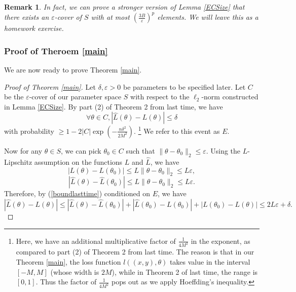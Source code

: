 \documentclass[11pt]{article}
\newtheorem{remark}[theorem]{Remark}
\newcommand{\norm}[1]{\| #1 \|}
\renewcommand{\epsilon}{\varepsilon}
\begin{document}
\begin{remark}
In fact, we can prove a stronger version of Lemma \ref{ECSize} that there exists an $\epsilon$-cover of $S$ with at most $\left(\frac{3B}{\epsilon}\right)^p$ elements. We will leave this as a homework exercise.
\end{remark}

\subsubsection{Proof of Theroem \ref{main}}

We are now ready to prove Theorem \ref{main}. 
\begin{proof}[Proof of Theorem \ref{main}]
Let $\delta, \epsilon>0$ be parameters to be specified later. Let $C$ be the $\epsilon$-cover of our parameter space $S$ with respect to the $\ell_2$-norm constructed in Lemma \ref{ECSize}. By part (2) of Theorem 2 from last time, we have
\begin{equation}\label{boundlasttime}
    \forall \theta \in C, |\hat L(\theta) - L(\theta)| \le \delta
\end{equation}
with probability $\ge 1 - 2|C|\exp(-\tfrac{n\delta^2}{2M^2})$. \footnote{Here, we have an additional multiplicative factor of $\frac{1}{4M^2}$ in the exponent, as compared to part (2) of Theorem 2 from last time. The reason is that in our Theorem \ref{main}, the loss function $l((x,y),\theta)$ takes value in the interval $[-M, M]$ (whose width is $2M$), while in Theorem 2 of last time, the range is $[0,1]$. Thus the factor of $\frac{1}{4M^2}$ pops out as we apply Hoeffding's inequality.} We refer to this event as $E$.

Now for any $\theta \in S$, we can pick $\theta_0 \in C$ such that $\norm{\theta-\theta_0}_2 \le \epsilon$. Using the $L$-Lipschitz assumption on the functions $L$ and $\hat L$, we have
$$  |L(\theta) - L(\theta_0)| \le L \norm{\theta-\theta_0}_2 \le L\epsilon,$$
$$  |\hat L(\theta) - \hat L(\theta_0)| \le L \norm{\theta-\theta_0}_2 \le L\epsilon.$$
Therefore, by (\ref{boundlasttime}) conditioned on $E$, we have
\begin{equation} \label{triangle}
    |\hat L(\theta) -  L(\theta)| \le |\hat L(\theta)-\hat L(\theta_0)| + |\hat L(\theta_0) -  L(\theta_0)| + | L(\theta_0) - L(\theta)| \le 2L\epsilon+\delta.
\end{equation}



\end{proof}
\end{document}

